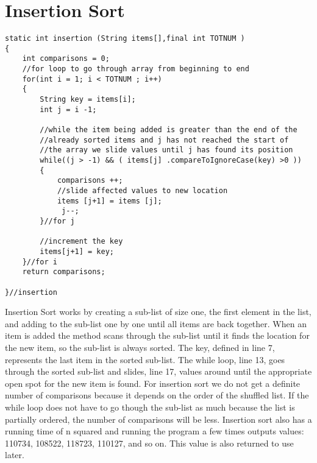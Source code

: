 \documentclass{article}
\begin{document}
\small
\section{Insertion Sort}
\begin{lstlisting}[frame =single,
backgroundcolor = \color{grey!12}]
static int insertion (String items[],final int TOTNUM ) 
{
	int comparisons = 0;
	//for loop to go through array from beginning to end 
	for(int i = 1; i < TOTNUM ; i++)
	{
		String key = items[i];
		int j = i -1; 
		
		//while the item being added is greater than the end of the 
		//already sorted items and j has not reached the start of 
		//the array we slide values until j has found its position
		while((j > -1) && ( items[j] .compareToIgnoreCase(key) >0 ))
		{
			comparisons ++; 
			//slide affected values to new location
			items [j+1] = items [j];  
             j--; 
		}//for j
		
		//increment the key
		items[j+1] = key; 
	}//for i
	return comparisons;
 
}//insertion
\end{lstlisting}
\large
Insertion Sort works by creating a sub-list of size one, the first element in the list, and adding to the sub-list one by one until all items are back together. When an item is added the method scans through the sub-list until it finds the location for the new item, so the sub-list is always sorted. The key, defined in line 7, represents the last item in the sorted sub-list. The while loop, line 13, goes through the sorted sub-list and slides, line 17, values around until the appropriate open spot for the new item is found. For insertion sort we do not get a definite number of comparisons because it depends on the order of the shuffled list. If the while loop does not have to go though the sub-list as much because the list is partially ordered, the number of comparisons will be less. Insertion sort also has a running time of n squared and running the program a few times outputs values: 110734, 108522, 118723, 110127, and so on. This value is also returned to use later. 

\small
\end{document}

